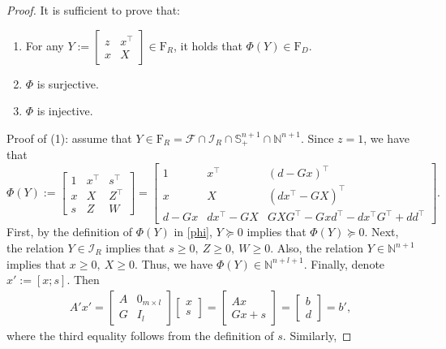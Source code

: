 \documentclass[10pt,a4paper]{amsart}
\def\F{\mathcal{F}}
\def\I{\mathcal{I}}
\def\bN{\mathbb{N}}
\begin{document}
\begin{proof}
It is sufficient to prove that:
\begin{enumerate}
\item[(1)] For any $Y:=\begin{bmatrix}
z&x^\top\\
x&X
\end{bmatrix}\in{\mathrm{F}_R}$, it holds that $\Phi(Y)\in {\mathrm{F}_D}$.
\item[(2)] $\Phi$ is surjective.
\item[(3)] $\Phi$ is injective.
\end{enumerate}
Proof of (1): assume that $Y\in{\mathrm{F}_R}=\F\cap\I_R\cap \mathbb{S}_{+}^{n+1} \cap\mathbb{N}^{n+1}$. Since $z=1$, we have that  
\[
\Phi(Y):=\begin{bmatrix}
1&x^\top&s^\top\\
x&X&Z^\top\\
s&Z&W
\end{bmatrix}=\begin{bmatrix}
             1&x^\top&(d-Gx)^\top\\
             x&X&(dx^\top-GX)^\top\\
             d-Gx&dx^\top-GX&GXG^\top -Gxd^\top -dx^\top G^\top +dd^\top
         \end{bmatrix}.
\]
First, by the definition of $\Phi(Y)$ in \eqref{phi}, $Y\succeq 0$ implies that $\Phi(Y)\succeq 0$. Next, the relation $Y\in\I_R$ implies that $s\geq 0,\ Z\geq 0,\ W\geq 0$. Also, the relation $Y\in \mathbb{N}^{n+1}$ implies that $x\geq 0,\ X\geq 0$. Thus, we have $\Phi(Y)\in \bN^{n+l+1}$. Finally, denote $x':=[x;s]$. 
Then
\begin{equation*}
\begin{aligned}
A'x'
=\begin{bmatrix}
A&0_{m\times l}\\
 G&I_l
\end{bmatrix}\begin{bmatrix}
x\\s
\end{bmatrix}
=\begin{bmatrix}
Ax\\
Gx+s
\end{bmatrix}
=\begin{bmatrix}
b\\
d
\end{bmatrix}
=b', 
\end{aligned}
\end{equation*}
where the third equality follows from the definition of $s$. Similarly,

\end{proof}
\end{document}
